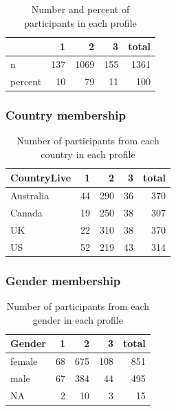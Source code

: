 \documentclass[]{article}
\begin{document}
\begin{table}[H]

\caption{\label{tab:unnamed-chunk-11}Number and percent of participants in each profile}
\centering
\fontsize{6}{8}\selectfont
\begin{tabular}[t]{lrrrr}
\toprule
  & 1 & 2 & 3 & total\\
\midrule
n & 137 & 1069 & 155 & 1361\\
percent & 10 & 79 & 11 & 100\\
\bottomrule
\end{tabular}
\end{table}

\hypertarget{country-membership-1}{%
\subsubsection{Country membership}\label{country-membership-1}}

\begin{table}[H]

\caption{\label{tab:unnamed-chunk-12}Number of participants from each country in each profile}
\centering
\fontsize{6}{8}\selectfont
\begin{tabular}[t]{lrrrr}
\toprule
CountryLive & 1 & 2 & 3 & total\\
\midrule
Australia & 44 & 290 & 36 & 370\\
Canada & 19 & 250 & 38 & 307\\
UK & 22 & 310 & 38 & 370\\
US & 52 & 219 & 43 & 314\\
\bottomrule
\end{tabular}
\end{table}

\hypertarget{gender-membership-1}{%
\subsubsection{Gender membership}\label{gender-membership-1}}

\begin{table}[H]

\caption{\label{tab:unnamed-chunk-13}Number of participants from each gender in each profile}
\centering
\fontsize{6}{8}\selectfont
\begin{tabular}[t]{lrrrr}
\toprule
Gender & 1 & 2 & 3 & total\\
\midrule
female & 68 & 675 & 108 & 851\\
male & 67 & 384 & 44 & 495\\
NA & 2 & 10 & 3 & 15\\
\bottomrule
\end{tabular}
\end{table}
\end{document}
